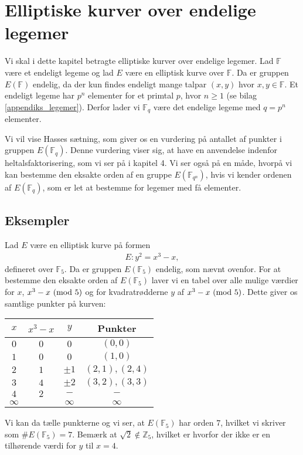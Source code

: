 \chapter{Elliptiske kurver over endelige legemer}

Vi skal i dette kapitel betragte elliptiske kurver over endelige legemer. Lad $\mathbb{F}$ være et endeligt legeme og lad $E$ være en elliptisk kurve over $\mathbb{F}$. Da er gruppen $E(\mathbb{F})$ endelig, da der kun findes endeligt mange talpar $(x, y)$ hvor $x, y \in \mathbb{F}$. Et endeligt legeme har $p^n$ elementer for et primtal $p$, hvor $n \geq 1$ (se bilag \ref{appendiks_legemer}). Derfor lader vi $\mathbb{F}_{q}$ være det endelige legeme med $q = p^n$ elementer. 

Vi vil vise Hasses sætning, som giver os en vurdering på antallet af punkter i gruppen $E(\mathbb{F}_q)$. Denne vurdering viser sig, at have en anvendelse indenfor heltalsfaktorisering, som vi ser på i kapitel 4. Vi ser også på en måde, hvorpå vi kan bestemme den eksakte orden af en gruppe $E(\mathbb{F}_{q^n})$, hvis vi kender ordenen af $E(\mathbb{F}_q)$, som er let at bestemme for legemer med få elementer.


\section{Eksempler}

Lad $E$ være en elliptisk kurve på formen
\begin{align*}
	E : y^2 = x^3 - x,
\end{align*}
defineret over $\mathbb{F}_5$. Da er gruppen $E(\mathbb{F}_5)$ endelig, som nævnt ovenfor. For at bestemme den eksakte orden af $E(\mathbb{F}_5)$ laver vi en tabel over alle mulige værdier for $x$, $x^3-x \ (\mathrm{mod} \ 5)$ og for kvadratrødderne $y$ af $x^3 - x \ (\mathrm{mod} \ 5)$. Dette giver os samtlige punkter på kurven:
\begin{center}
\begin{tabular}{c c c c }
$x$ & $x^3 - x$ & $y$ & Punkter \\ 
\hline
$0$ & $0$ & $0$ & $(0, 0)$ \\ 
$1$ & $0$ & $0$ & $(1, 0)$ \\ 
$2$ & $1$ & $\pm 1$ & $(2, 1), (2, 4)$ \\ 
$3$ & $4$ & $\pm 2$ & $(3, 2), (3, 3)$ \\ 
$4$ & $2$ & $-$ & $-$ \\ 
$\infty$ & & $\infty$ & $\infty$ \\
\end{tabular} 
\end{center}
Vi kan da tælle punkterne og vi ser, at $E(\mathbb{F}_5)$ har orden $7$, hvilket vi skriver som 
$\#E(\mathbb{F}_5) = 7$. Bemærk at $\sqrt{2} \notin \mathbb{Z}_5$, hvilket er hvorfor der ikke er en tilhørende værdi for $y$ til $x=4$.

